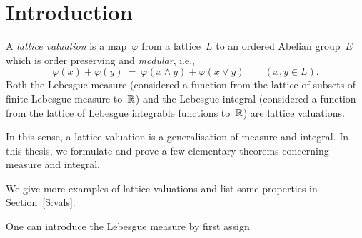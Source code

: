 \documentclass[main.tex]{subfiles}
\begin{document}
\section{Introduction}
A \emph{lattice valuation}
is a map~$\varphi$ from a lattice~$L$
to an ordered Abelian group~$E$
which is order preserving and \emph{modular}, i.e.,
\begin{equation*}
\varphi(x)+\varphi(y) \ =\ 
\varphi(x\wedge y)+ \varphi(x \vee y)
\qquad(x,y\in L).
\end{equation*}
Both the Lebesgue measure (considered
a function from the lattice of subsets of finite Lebesgue measure 
to~$\mathbb{R}$)
and the Lebesgue integral (considered
a function from the lattice of Lebesgue integrable 
functions to~$\mathbb{R}$) are lattice valuations.

In this sense, a lattice valuation
is a generalisation of measure and integral.
In this thesis,
we formulate and prove a few elementary
theorems concerning measure and integral.


We give more examples 
of lattice valuations
and list some properties
in Section~\ref{S:vals}.

One can introduce the Lebesgue measure
by first assign
\end{document}
